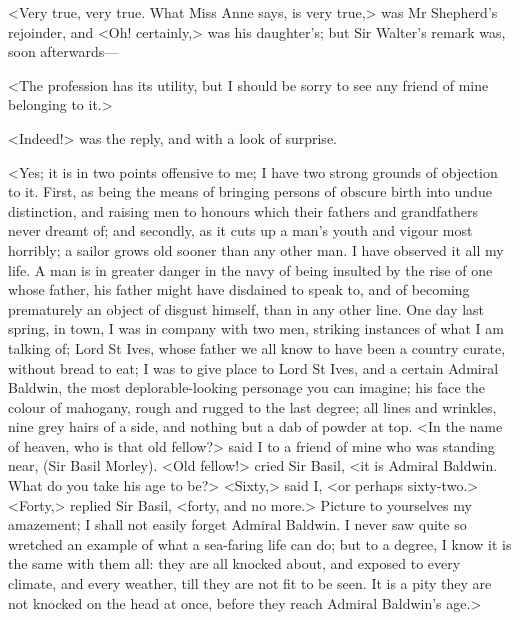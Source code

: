 <Very true, very true. What Miss Anne says, is very true,> was Mr Shepherd's rejoinder, and <Oh! certainly,> was his daughter's; but Sir Walter's remark was, soon afterwards—

<The profession has its utility, but I should be sorry to see any friend of mine belonging to it.>

<Indeed!> was the reply, and with a look of surprise.

<Yes; it is in two points offensive to me; I have two strong grounds of objection to it. First, as being the means of bringing persons of obscure birth into undue distinction, and raising men to honours which their fathers and grandfathers never dreamt of; and secondly, as it cuts up a man's youth and vigour most horribly; a sailor grows old sooner than any other man. I have observed it all my life. A man is in greater danger in the navy of being insulted by the rise of one whose father, his father might have disdained to speak to, and of becoming prematurely an object of disgust himself, than in any other line. One day last spring, in town, I was in company with two men, striking instances of what I am talking of; Lord St Ives, whose father we all know to have been a country curate, without bread to eat; I was to give place to Lord St Ives, and a certain Admiral Baldwin, the most deplorable-looking personage you can imagine; his face the colour of mahogany, rough and rugged to the last degree; all lines and wrinkles, nine grey hairs of a side, and nothing but a dab of powder at top. <In the name of heaven, who is that old fellow?> said I to a friend of mine who was standing near, (Sir Basil Morley). <Old fellow!> cried Sir Basil, <it is Admiral Baldwin. What do you take his age to be?> <Sixty,> said I, <or perhaps sixty-two.> <Forty,> replied Sir Basil, <forty, and no more.> Picture to yourselves my amazement; I shall not easily forget Admiral Baldwin. I never saw quite so wretched an example of what a sea-faring life can do; but to a degree, I know it is the same with them all: they are all knocked about, and exposed to every climate, and every weather, till they are not fit to be seen. It is a pity they are not knocked on the head at once, before they reach Admiral Baldwin's age.>

